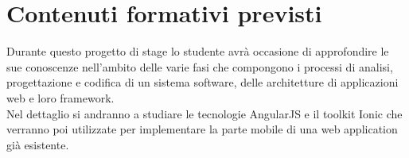 \section*{Contenuti formativi previsti}
Durante questo progetto di stage lo studente avrà occasione di approfondire le 
sue conoscenze nell’ambito delle varie fasi che compongono i processi di analisi, 
progettazione e codifica di un sistema software, delle architetture di applicazioni 
web e loro framework. \\
Nel dettaglio si andranno a studiare le tecnologie AngularJS 
e il toolkit Ionic che verranno poi utilizzate per implementare la parte mobile di 
una web application già esistente.
\newpage